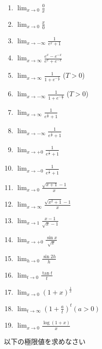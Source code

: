 \documentclass[twocolumn,11pt]{jarticle}
\begin{document}
\begin{enumerate}
\item \label{litem:(x->0)0/x}$\displaystyle\lim_{x\to 0}\frac{0}{x}$
\item \label{litem:(x->0)x/0}$\displaystyle\lim_{x\to 0}\frac{x}{0}$
\item \label{litem:1/ex+1}$\displaystyle\lim_{x\to-\infty}\frac{1}{e^x+1}$
\item \label{litem:ex-e-x/ex+e-x}$\displaystyle\lim_{x\to\infty}\frac{e^x-e^{-x}}{e^x+e^{-x}}$
\item
  \label{litem:(+)1/1+e(-x/T)}$\displaystyle\lim_{x\to\infty}\frac{1}{1+e^{-\frac{x}{T}}}$ \quad($T>0$)
\item
  \label{litem:(-)1/1+e(-x/T)}$\displaystyle\lim_{x\to-\infty}\frac{1}{1+e^{-\frac{x}{T}}}$ \quad($T>0$)
\item \label{litem:(+)1/e{1/x}+1}$\displaystyle\lim_{x\to\infty}\frac{1}{e^\frac{1}{x}+1}$
\item \label{litem:(-)1/e{1/x}+1}$\displaystyle\lim_{x\to-\infty}\frac{1}{e^\frac{1}{x}+1}$
\item \label{litem:(+0)1/e{1/x}+1}$\displaystyle\lim_{x\to+0}\frac{1}{e^\frac{1}{x}+1}$
\item \label{litem:(-0)1/e{1/x}+1}$\displaystyle\lim_{x\to-0}\frac{1}{e^\frac{1}{x}+1}$
\item \label{litem:sqrt(x+1)-1}$\displaystyle\lim_{x\to 0}\frac{\sqrt{x+1}-1}{x}$
\item \label{litem:sqrt(x2+1)-1}$\displaystyle\lim_{x\to\infty}\frac{\sqrt{x^2+1}-1}{x}$
\item \label{litem:(x-1)/sqrt(x)-1}$\displaystyle\lim_{x\to1}\frac{x-1}{\sqrt{x}-1}$
\item \label{litem:sinx/sqrtx}$\displaystyle\lim_{x\to+0}\frac{\sin x}{\sqrt{x}}$
\item \label{litem:sin2h/h}$\displaystyle\lim_{h\to0}\frac{\sin 2h}{h}$
\item \label{litem:tan t/t}$\displaystyle\lim_{t\to0}\frac{\tan t}{t}$
\item \label{litem:(1+x)^1/x}$\displaystyle\lim_{x\to0}(1+x)^{\frac{1}{x}}$
\item \label{litem:(1+a/t)^t}$\displaystyle\lim_{t\to\infty}\left(1+\frac{a}{t}\right)^t$\quad$(a>0)$
\item \label{litem:log(1+x)/x}$\displaystyle\lim_{x\to0}\frac{\log (1+x)}{x}$
\end{enumerate}

\nquestion
以下の極限値を求めなさい
\end{document}
